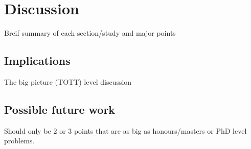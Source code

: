 \chapter{Discussion}

Breif summary of each section/study and major points

\section{Implications}
The big picture (TOTT) level discussion

\section{Possible future work}
Should only be 2 or 3 points that are as big as honours/masters or PhD level problems. 

